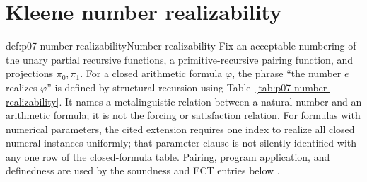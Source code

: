 \section{Kleene number realizability}
\label{sec:p07-number-realizability}

\begin{hbdefinition}{def:p07-number-realizability}{Number realizability}
Fix an acceptable numbering of the unary partial recursive functions, a
primitive-recursive pairing function, and projections \(\pi_0,\pi_1\).  For
a closed arithmetic formula \(\varphi\), the phrase
``the number \(e\) realizes \(\varphi\)'' is defined by structural recursion using
Table~\ref{tab:p07-number-realizability}.  It names a metalinguistic relation
between a natural number and an arithmetic formula; it is not the forcing or
satisfaction relation.  For formulas with numerical parameters, the cited
extension requires one index to realize all closed numeral instances
uniformly; that parameter clause is not silently identified with any one row
of the closed-formula table.  Pairing, program application, and definedness
are used by the soundness and ECT entries below \cite{Troelstra1998}.
\end{hbdefinition}

